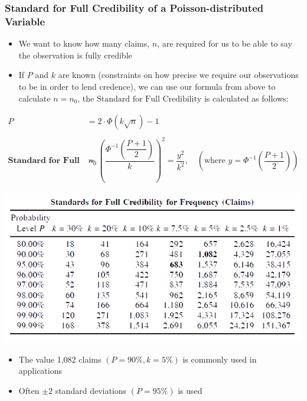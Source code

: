 \documentclass[
]{article}
\begin{document}
\begin{orange}

\hypertarget{standard-for-full-credibility-of-a-poisson-distributed-variable}{%
\subsubsection{Standard for Full Credibility of a Poisson-distributed
Variable}\label{standard-for-full-credibility-of-a-poisson-distributed-variable}}

\begin{itemize}
\item
  We want to know how many claims, \(n\), are required for us to be able
  to say the observation is fully credible
\item
  If \(P\) and \(k\) are known (constraints on how precise we require
  our observations to be in order to lend credence), we can use our
  formula from above to calculate \(n=n_0\), the
  \(\text{Standard for Full Credibility}\) is calculated as follows:
\end{itemize}

\[
  \begin{align}
    P &= 2 \cdot \Phi(k\sqrt{n}) - 1 \\ \\
    \textbf{Standard for Full Credibility (Poisson): } \quad n_0 &= \left(\dfrac{\Phi^{-1}\left( \dfrac{P+1}{2} \right)}{k} \right)^2 =\dfrac{y^2}{k^2}, \quad \left(\text{where } y = \Phi^{-1}\left(\dfrac{P+1}{2}\right)\right) 
  \end{align}
\]

\includegraphics{Figures/2+.png}

\begin{itemize}
\item
  The value 1,082 claims \(\left(P=90\%, k=5\%\right)\) is commonly used
  in applications
\item
  Often \(\pm2\) standard deviations \((P=95\%)\) is used
\end{itemize}

\end{orange}
\end{document}
